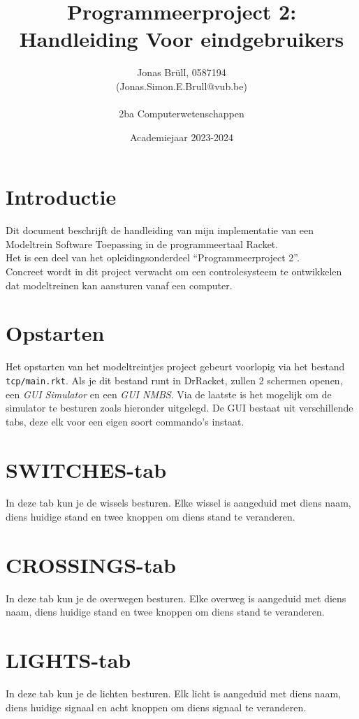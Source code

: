 \documentclass[a4paper, 11pt]{article}
\title{Programmeerproject 2:\\ Handleiding Voor eindgebruikers}
\date{Academiejaar 2023-2024}
\author{Jonas Br\"ull, 0587194\\ (Jonas.Simon.E.Brull@vub.be)\\\\ 2ba Computerwetenschappen}
\newcommand{\<}{\scriptsize\textless\normalsize}
\renewcommand{\>}{\scriptsize\textgreater\normalsize}
\begin{document}
\maketitle
\newpage

\tableofcontents
\newpage

\pagestyle{fancy}
\setcounter{page}{1}

\section{Introductie} %
Dit document beschrijft de handleiding van mijn implementatie van een Modeltrein Software Toepassing in de programmeertaal Racket.\\
Het is een deel van het opleidingsonderdeel ``Programmeerproject 2''.\\
Concreet wordt in dit project verwacht om een controlesysteem te ontwikkelen dat modeltreinen kan aansturen vanaf een computer.

\section{Opstarten}
Het opstarten van het modeltreintjes project gebeurt voorlopig via het bestand \texttt{tcp/main.rkt}. Als je dit bestand runt in DrRacket, zullen 2 schermen openen, een \emph{GUI Simulator} en een \emph{GUI NMBS}. Via de laatste is het mogelijk om de simulator te besturen zoals hieronder uitgelegd. De GUI bestaat uit verschillende tabs, deze elk voor een eigen soort commando's instaat.

\section{SWITCHES-tab}
In deze tab kun je de wissels besturen. Elke wissel is aangeduid met diens naam, diens huidige stand en twee knoppen om diens stand te veranderen.

\section{CROSSINGS-tab}
In deze tab kun je de overwegen besturen. Elke overweg is aangeduid met diens naam, diens huidige stand en twee knoppen om diens stand te veranderen.

\section{LIGHTS-tab}
In deze tab kun je de lichten besturen. Elk licht is aangeduid met diens naam, diens huidige signaal en acht knoppen om diens signaal te veranderen.

\label{lastpage}
\end{document}
